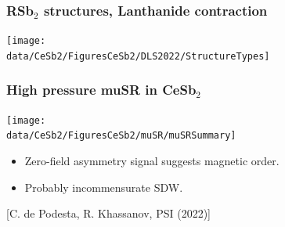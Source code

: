 \begin{frame}[label=CeSb2xray-1]
\frametitle{RSb$_2$ structures, Lanthanide contraction}
\centerline{\texttt{[image: \\data/CeSb2/FiguresCeSb2/DLS2022/StructureTypes]}}

\end{frame}


\begin{frame}[label=CeSb2muSR]
    \frametitle{High pressure muSR in CeSb$_2$}
    \vspace{0em}
    \centerline{\texttt{[image: \\data/CeSb2/FiguresCeSb2/muSR/muSRSummary]}}
    
    \begin{itemize}
    \item Zero-field asymmetry signal suggests magnetic order.
    \item Probably incommensurate SDW.
    \end{itemize}
    
    
    \vspace{0em}
    \centerline{\makebox[\linewidth]{\rule{0.85\textwidth}{0.4pt}}}
    
    \centerline{\scriptsize [C. de Podesta, R. Khassanov, PSI (2022)]}
    
\end{frame}

